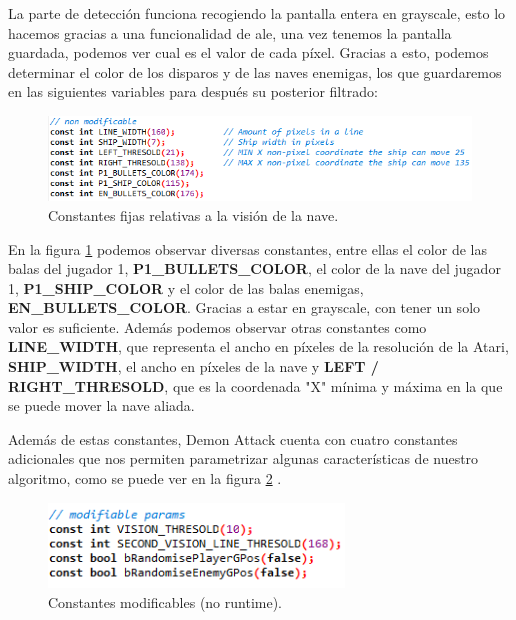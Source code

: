 La parte de detección funciona recogiendo la pantalla entera en grayscale, esto lo hacemos gracias a una funcionalidad de \ac{ale}, una vez tenemos la pantalla guardada, podemos ver cual es el valor de cada píxel. Gracias a esto, podemos determinar el color de los disparos y de las naves enemigas, los que guardaremos en las siguientes variables para después su posterior filtrado:

\begin{figure}[h]
	\centering
	\includegraphics[width=1\textwidth]{Figures/demonAttackStaticOne}
	\caption{Constantes fijas relativas a la visión de la nave.}
	\label{fig:demonAttackStaticOne}
\end{figure}

En la figura \ref{fig:demonAttackStaticOne} podemos observar diversas constantes, entre ellas el color de las balas del jugador 1, \textbf{P1\_BULLETS\_COLOR}, el color de la nave del jugador 1, \textbf{P1\_SHIP\_COLOR} y el color de las balas enemigas, \textbf{EN\_BULLETS\_COLOR}. Gracias a estar en grayscale, con tener un solo valor es suficiente. Además podemos observar otras constantes como \textbf{LINE\_WIDTH}, que representa el ancho en píxeles de la resolución de la Atari, \textbf{SHIP\_WIDTH}, el ancho en píxeles de la nave y \textbf{LEFT / RIGHT\_THRESOLD}, que es la coordenada "X" mínima y máxima en la que se puede mover la nave aliada.

\newpage
Además de estas constantes, Demon Attack cuenta con cuatro constantes adicionales que nos permiten parametrizar algunas características de nuestro algoritmo, como se puede ver en la figura \ref{fig:demonAttackChangableOne} .

\begin{figure}[h]
	\centering
	\includegraphics[width=0.7\textwidth]{Figures/demonAttackChangableOne}
	\caption{Constantes modificables (no runtime).}
	\label{fig:demonAttackChangableOne}
\end{figure}

